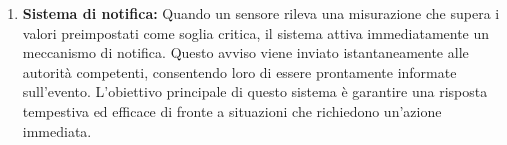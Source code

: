 \begin{enumerate}
    \item \textbf{Sistema di notifica:} Quando un sensore rileva una misurazione che supera i valori preimpostati come soglia critica, il sistema attiva immediatamente un meccanismo di notifica. Questo avviso viene inviato istantaneamente alle autorità competenti, consentendo loro di essere prontamente informate sull'evento. L'obiettivo principale di questo sistema è garantire una risposta tempestiva ed efficace di fronte a situazioni che richiedono un'azione immediata.
\end{enumerate}